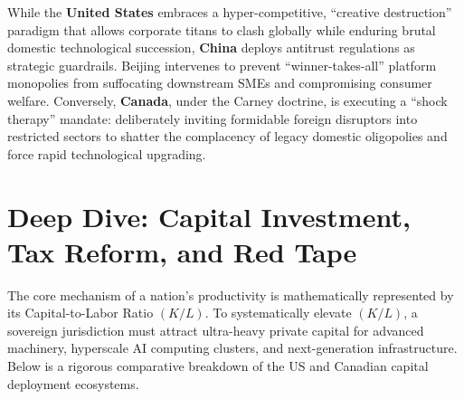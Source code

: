 \documentclass[11pt,a4paper]{article}
\begin{document}
While the \textbf{United States} embraces a hyper-competitive, ``creative destruction'' paradigm that allows corporate titans to clash globally while enduring brutal domestic technological succession, \textbf{China} deploys antitrust regulations as strategic guardrails. Beijing intervenes to prevent ``winner-takes-all'' platform monopolies from suffocating downstream SMEs and compromising consumer welfare. Conversely, \textbf{Canada}, under the Carney doctrine, is executing a ``shock therapy'' mandate: deliberately inviting formidable foreign disruptors into restricted sectors to shatter the complacency of legacy domestic oligopolies and force rapid technological upgrading.

\section{Deep Dive: Capital Investment, Tax Reform, and Red Tape}

The core mechanism of a nation's productivity is mathematically represented by its Capital-to-Labor Ratio $(K/L)$. To systematically elevate $(K/L)$, a sovereign jurisdiction must attract ultra-heavy private capital for advanced machinery, hyperscale AI computing clusters, and next-generation infrastructure. Below is a rigorous comparative breakdown of the US and Canadian capital deployment ecosystems.

\vspace{0.5cm}
\end{document}
